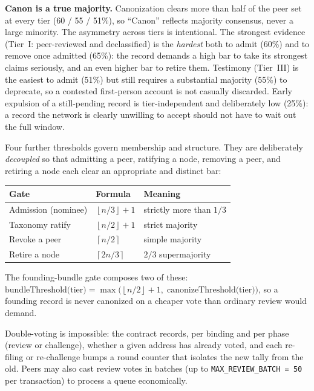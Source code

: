 \documentclass[11pt,a4paper]{article}
\newcommand{\ceilop}[1]{\ensuremath{\left\lceil #1 \right\rceil}}
\newcommand{\floorop}[1]{\ensuremath{\left\lfloor #1 \right\rfloor}}
\begin{document}
\vspace{0.4em}

\textbf{Canon is a true majority.} Canonization clears more than half of the
peer set at every tier (60 / 55 / 51\%), so ``Canon'' reflects majority
consensus, never a large minority. The asymmetry across tiers is
intentional. The strongest evidence (Tier~I: peer-reviewed and declassified)
is the \emph{hardest} both to admit (60\%) and to remove once admitted
(65\%): the record demands a high bar to take its strongest claims seriously,
and an even higher bar to retire them. Testimony (Tier~III) is the easiest to
admit (51\%) but still requires a substantial majority (55\%) to deprecate,
so a contested first-person account is not casually discarded. Early
expulsion of a still-pending record is tier-independent and deliberately low
(25\%): a record the network is clearly unwilling to accept should not have
to wait out the full window.

Four further thresholds govern membership and structure. They are
deliberately \emph{decoupled} so that admitting a peer, ratifying a node,
removing a peer, and retiring a node each clear an appropriate and distinct
bar:

\begin{center}
\begin{tabular}{@{}lll@{}}
\toprule
\textbf{Gate} & \textbf{Formula} & \textbf{Meaning} \\
\midrule
Admission (nominee)   & $\floorop{n/3} + 1$   & strictly more than $1/3$ \\
Taxonomy ratify       & $\floorop{n/2} + 1$   & strict majority \\
Revoke a peer         & $\ceilop{n/2}$        & simple majority \\
Retire a node         & $\ceilop{2n/3}$       & $2/3$ supermajority \\
\bottomrule
\end{tabular}
\end{center}

\vspace{0.4em}

The founding-bundle gate composes two of these:
$\text{bundleThreshold(tier)} = \max\!\big(\floorop{n/2}+1,\;
\text{canonizeThreshold(tier)}\big)$, so a founding record is never
canonized on a cheaper vote than ordinary review would demand.

Double-voting is impossible: the contract records, per binding and per phase
(review or challenge), whether a given address has already voted, and each
re-filing or re-challenge bumps a round counter that isolates the new tally
from the old. Peers may also cast review votes in batches (up to
\texttt{MAX\_REVIEW\_BATCH = 50} per transaction) to process a queue
economically.
\end{document}
